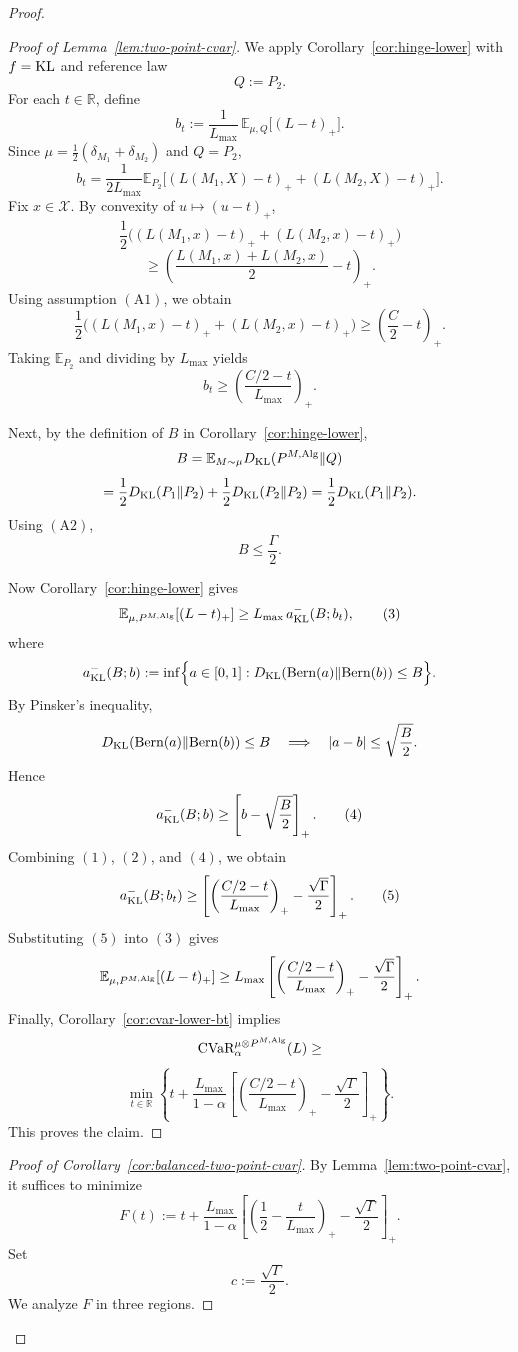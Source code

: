 \documentclass[conference]{IEEEtran}
\begin{document}
\begin{proof}[Proof]
\begin{proof}[Proof of Lemma~\ref{lem:two-point-cvar}]
We apply Corollary~\ref{cor:hinge-lower} with \(f=\textup{KL}\) and reference law
\[
Q:=P_2.
\]
For each \(t\in\mathbb{R}\), define
\[
b_t:=\frac{1}{L_{\max}}\,
\mathbb{E}_{\mu,Q}\big[(L-t)_+\big].
\]
Since \(\mu=\frac12(\delta_{M_1}+\delta_{M_2})\) and \(Q=P_2\),
\[
b_t
=
\frac{1}{2L_{\max}}
\mathbb{E}_{P_2}\big[(L(M_1,X)-t)_+ + (L(M_2,X)-t)_+\big].
\]
Fix \(x\in\mathcal{X}\). By convexity of \(u\mapsto (u-t)_+\),
\[
\frac12\Big((L(M_1,x)-t)_+ + (L(M_2,x)-t)_+\Big)
\]
\[
\ge
\left(\frac{L(M_1,x)+L(M_2,x)}{2}-t\right)_+.
\]
Using assumption \((\mathrm{A1})\), we obtain
\[
\frac12\Big((L(M_1,x)-t)_+ + (L(M_2,x)-t)_+\Big)
\ge
\left(\frac{C}{2}-t\right)_+.
\]
Taking \(\mathbb{E}_{P_2}\) and dividing by \(L_{\max}\) yields
\[
b_t\ge \left(\frac{C/2-t}{L_{\max}}\right)_+.
\tag{1}
\]

Next, by the definition of \(B\) in Corollary~\ref{cor:hinge-lower},
\[
B
=
\mathbb{E}_{M\sim\mu}D_{\textup{KL}}(P^{M,\textup{Alg}}\|Q)
\]
\[=
\frac12D_{\textup{KL}}(P_1\|P_2)+\frac12D_{\textup{KL}}(P_2\|P_2)
=
\frac12D_{\textup{KL}}(P_1\|P_2).
\]
Using \((\mathrm{A2})\),
\[
B\le \frac{\Gamma}{2}.
\tag{2}
\]

Now Corollary~\ref{cor:hinge-lower} gives
\[
\mathbb{E}_{\mu,P^{M,\textup{Alg}}}[(L-t)_+]
\ge
L_{\max}\,a^{-}_{\textup{KL}}(B;b_t),
\tag{3}
\]
where
\[
a^{-}_{\textup{KL}}(B;b)
:=
\inf\Bigl\{a\in[0,1]:
D_{\textup{KL}}(\textup{Bern}(a)\|\textup{Bern}(b))\le B
\Bigr\}.
\]
By Pinsker's inequality,
\[
D_{\textup{KL}}(\textup{Bern}(a)\|\textup{Bern}(b))\le B
\quad\Longrightarrow\quad
|a-b|\le \sqrt{\frac{B}{2}}.
\]
Hence
\[
a^{-}_{\textup{KL}}(B;b)\ge \left[b-\sqrt{\frac{B}{2}}\right]_+.
\tag{4}
\]
Combining \((1)\), \((2)\), and \((4)\), we obtain
\[
a^{-}_{\textup{KL}}(B;b_t)
\ge
\left[
\left(\frac{C/2-t}{L_{\max}}\right)_+
-\frac{\sqrt{\Gamma}}{2}
\right]_+.
\tag{5}
\]
Substituting \((5)\) into \((3)\) gives
\[
\mathbb{E}_{\mu,P^{M,\textup{Alg}}}[(L-t)_+]
\ge
L_{\max}
\left[
\left(\frac{C/2-t}{L_{\max}}\right)_+
-\frac{\sqrt{\Gamma}}{2}
\right]_+.
\]
Finally, Corollary~\ref{cor:cvar-lower-bt} implies
\[
\textup{CVaR}_\alpha^{\mu\otimes P^{M,\textup{Alg}}}(L)\ge\]
\[
\min_{t\in\mathbb{R}}
\left\{
t+\frac{L_{\max}}{1-\alpha}
\left[
\left(\frac{C/2-t}{L_{\max}}\right)_+
-\frac{\sqrt{\Gamma}}{2}
\right]_+
\right\}.
\]
This proves the claim.
\end{proof}

\begin{proof}[Proof of Corollary~\ref{cor:balanced-two-point-cvar}]
By Lemma~\ref{lem:two-point-cvar}, it suffices to minimize
\[
F(t):=
t+\frac{L_{\max}}{1-\alpha}
\left[
\left(\frac12-\frac{t}{L_{\max}}\right)_+
-\frac{\sqrt{\Gamma}}{2}
\right]_+.
\]
Set
\[
c:=\frac{\sqrt{\Gamma}}{2}.
\]
We analyze \(F\) in three regions.


\end{proof}
\end{proof}
\end{document}
